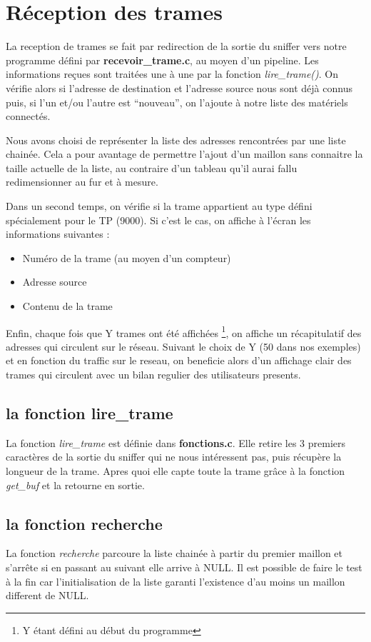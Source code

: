 \documentclass[a4paper,11pt]{article}
\begin{document}
	\section{Réception des trames}
	La reception de trames se fait par redirection de la sortie du sniffer vers notre programme défini par \textbf{recevoir\_trame.c}, au moyen d'un pipeline.
	Les informations reçues sont traitées une à une par la fonction \textit{lire\_trame()}. On vérifie alors si l'adresse de destination et l'adresse source nous sont déjà connus puis, si l'un et/ou l'autre est ``nouveau'', on l'ajoute à notre liste des matériels connectés.

	Nous avons choisi de représenter la liste des adresses rencontrées par une liste chainée. Cela a pour avantage de permettre l'ajout d'un maillon sans connaitre la taille actuelle de la liste, au contraire d'un tableau qu'il aurai fallu redimensionner au fur et à mesure.
	
	Dans un second temps, on vérifie si la trame appartient au type défini spécialement pour le TP (9000). Si c'est le cas, on affiche à l'écran les informations suivantes :
	\begin{itemize}
		\item Numéro de la trame (au moyen d'un compteur)
		\item Adresse source
		\item Contenu de la trame
	\end{itemize}

	Enfin, chaque fois que Y trames ont été affichées \footnote{Y étant défini au début du programme}, on affiche un récapitulatif des adresses qui circulent sur le réseau. Suivant le choix de Y (50 dans nos exemples) et en fonction du traffic sur le reseau, on beneficie alors d'un affichage clair des trames qui circulent avec un bilan regulier des utilisateurs presents. %
	\subsection{la fonction lire\_trame}
	La fonction \textit{lire\_trame} est définie dans \textbf{fonctions.c}. Elle retire les 3 premiers caractères de la sortie du sniffer qui ne nous intéressent pas, puis récupère la longueur de la trame. Apres quoi elle capte toute la trame grâce à la fonction \textit{get\_buf} et la retourne en sortie.
	\subsection{la fonction recherche}
	La fonction \textit{ recherche} parcoure la liste chainée à partir du premier maillon et s'arrête si en passant au suivant elle arrive à NULL. Il est possible de faire le test à la fin car l'initialisation de la liste garanti l'existence d'au moins un maillon different de NULL.
\end{document}
